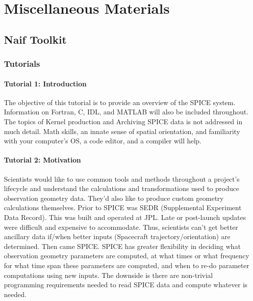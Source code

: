 \documentclass[crop=false,class=book]{standalone}
\begin{document}
\chapter{Miscellaneous Materials}
\section{Naif Toolkit}
\subsection{Tutorials}
\subsubsection{Tutorial 1: Introduction}
The objective of this tutorial is to provide an overview of the SPICE system. Information on Fortran, C, IDL, and MATLAB will also be included throughout. The topics of Kernel production and Archiving SPICE data is not addressed in much detail. Math skills, an innate sense of spatial orientation, and familiarity with your computer's OS, a code editor, and a compiler will help. 
\subsubsection{Tutorial 2: Motivation}
Scientists would like to use common tools and methods throughout a project's lifecycle and understand the calculations and transformations used to produce observation geometry data. They'd also like to produce custom geometry calculations themselves. Prior to SPICE was SEDR (Supplemental Experiment Data Record). This was built and operated at JPL. Late or post-launch updates were difficult and expensive to accommodate. Thus, scientists can't get better ancillary data if/when better inputs (Spacecraft trajectory/orientation) are determined. Then came SPICE. SPICE has greater flexibility in deciding what observation geometry parameters are computed, at what times or what frequency for what time span these parameters are computed, and when to re-do parameter computations using new inputs. The downside is there are non-trivial programming requirements needed to read SPICE data and compute whatever is needed. 
\end{document}
